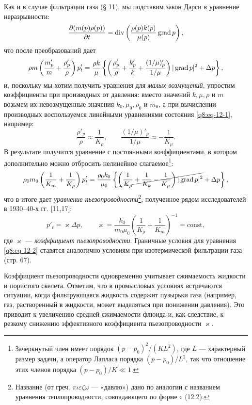 \setcounter{footnote}{0}
Как и в случае фильтрации газа (§ 11), мы подставим закон Дарси в уравнение неразрывности:
\[
\frac{\partial(m(p)\rho(p))}{\partial t}=\operatorname{div}\left(\frac{\rho(p)k(p)}{\mu(p)}\operatorname{grad} p\right),
\]
что после преобразований дает
\[
\rho m\left(\frac{m'_p}{m}+\frac{\rho'_p}{\rho}\right)p'_t=\frac{\rho k}{\mu}\left\{\left(\frac{\rho'_p}{\rho}+\frac{k'_p}{k}+\frac{(1/\mu)'_p}{1/\mu}\right)|\operatorname{grad} p|^2+\Delta p\right\},
\]
и, поскольку мы хотим получить уравнения для \textit{малых возмущений}, упростим коэффициенты при производных от давления: вместо значений $k,\mu,\rho$ и $m$ возьмем их невозмущенные значения $k_0,\mu_0,\rho_0$ и $m_0$, а при вычислении производных воспользуемся линейными уравнениями состояния \eqref{q8:eq-12-1}, например:
\[
\frac{\rho'_p}{\rho}\approx\frac{1}{K_\rho},\qquad \frac{(1/\mu)'_p}{1/\mu}\approx-\frac{1}{K_\mu}.
\]
В результате получится уравнение с постоянными коэффициентами, в котором дополнительно можно отбросить нелинейное слагаемое\footnote{Зачеркнутый член имеет порядок $(p-p_0)^2/(KL^2)$, где $L$ --- характерный размер задачи, а оператор Лапласа порядка $(p-p_0)/L^2$, так что отношение этих членов порядка $(p-p_0)/K\ll1$.}:
\[
\rho_0m_0\left(\frac{1}{K_m}+\frac{1}{K_\rho}\right)p'_t=\frac{\rho_0k_0}{\mu_0}\left\{\cancel{\left(\frac{1}{K_\rho}+\frac{1}{K_k}-\frac{1}{K_\mu}\right)|\operatorname{grad} p|^2}+\Delta p\right\},
\]
что в итоге дает \textit{уравнение пьезопроводности}\footnote{Название (от греч. $\pi\iota\varepsilon\zeta\omega$ --- «давлю») дано по аналогии с названием уравнения теплопроводности, совпадающего по форме с (12.2).}, полученное рядом исследователей в 1930--40-х гг. [11,17]:
\begin{equation}
p'_t=\varkappa\Delta p,\qquad \varkappa=\frac{k_0}{m_0\mu_0}\left(\frac{1}{K_\rho}+\frac{1}{K_m}\right)^{-1}=\mathrm{const},\tag{12.2}\label{q8:eq-12-2}
\end{equation}
где $\varkappa$ --- \textit{коэффициент пьезопроводности}. Граничные условия для уравнения \eqref{q8:eq-12-2} ставятся аналогично условиям при изотермической фильтрации газа (стр. 67).

\setcounter{footnote}{0}
Коэффициент пьезопроводности одновременно учитывает сжимаемость жидкости и пористого скелета. Отметим, что в промысловых условиях встречаются ситуации, когда фильтрующаяся жидкость содержит пузырьки газа (например, газ, растворенный в жидкости, может выделяться при понижении давления). Это приводит к увеличению средней сжимаемости флюида и, как следствие, к резкому снижению эффективного коэффициента пьезопроводности $\varkappa$.

